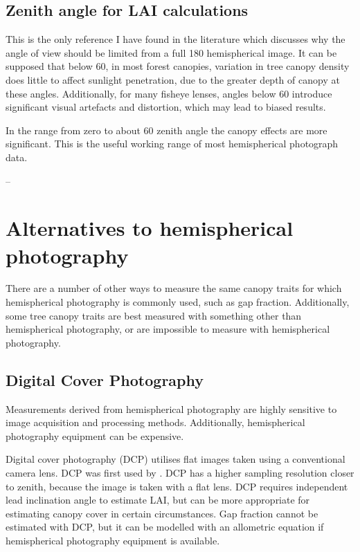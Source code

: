 \documentclass[11pt,a4paper]{article}
\begin{document}
\subsection{Zenith angle for LAI calculations} \label{fov}

This is the only reference I have found in the literature which discusses why the angle of view should be limited from a full 180\textdegree{} hemispherical image. It can be supposed that below 60\textdegree{}, in most forest canopies, variation in tree canopy density does little to affect sunlight penetration, due to the greater depth of canopy at these angles. Additionally, for many fisheye lenses, angles below 60\textdegree{} introduce significant visual artefacts and distortion, which may lead to biased results. 

\begin{minipage}{\linewidth}
\begin{framed}
In the range from zero to about 60 zenith angle the canopy effects are more significant. This is the useful working range of most hemispherical photograph data.

-- \citet{Jupp2009}
\end{framed}
\end{minipage}

\section{Alternatives to hemispherical photography}

There are a number of other ways to measure the same canopy traits for which hemispherical photography is commonly used, such as gap fraction. Additionally, some tree canopy traits are best measured with something other than hemispherical photography, or are impossible to measure with hemispherical photography.

\subsection{Digital Cover Photography}

Measurements derived from hemispherical photography are highly sensitive to image acquisition and processing methods. Additionally, hemispherical photography equipment can be expensive.

Digital cover photography (DCP) utilises flat images taken using a conventional camera lens. DCP was first used by \citet{Macfarlane2007a, Macfarlane2007b, Macfarlane2007c}. DCP has a higher sampling resolution closer to zenith, because the image is taken with a flat lens. DCP requires independent lead inclination angle to estimate LAI, but can be more appropriate for estimating canopy cover in certain circumstances. Gap fraction cannot be estimated with DCP, but it can be modelled with an allometric equation if hemispherical photography equipment is available.
\end{document}

